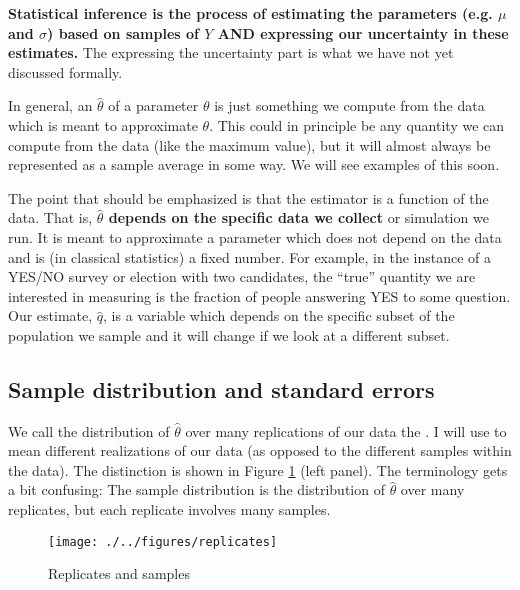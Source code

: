 {\bf Statistical inference is the process of estimating the parameters (e.g. $\mu$ and $\sigma$) based on samples of $Y$ AND expressing our uncertainty in these estimates.} The expressing the uncertainty part is what we have not yet discussed formally. 


In general, an  $\hat{\theta}$  of a parameter $\theta$ is just something we compute from the data which is meant to approximate $\theta$. This could in principle be any quantity we can compute from the data (like the maximum value), but it will almost always be represented as a sample average in some way. We will see examples of this soon. 

The point that should be emphasized is that the estimator is a function of the data. That is, {\bf $\hat{\theta}$ depends on the specific data we collect} or simulation we run. It is meant to approximate a parameter which does not depend on the data and is (in classical statistics) a fixed number. For example,  in the instance of a YES/NO survey or election with two candidates, the ``true'' quantity we are interested in measuring is the fraction of people answering YES to some question. Our estimate, $\hat{q}$, is a variable which depends on the specific subset of the population we sample and it will change if we look at a different subset. 



\subsection{Sample distribution and standard errors}
 We call the distribution of $\hat{\theta}$ over many replications of our data the . I will use  to mean different realizations of our data (as opposed to the different samples within the data). The distinction is shown in Figure \ref{fig:rep_samp} (left panel). The terminology gets a bit confusing: The sample distribution is the distribution of $\hat{\theta}$ over many replicates, but each replicate involves many samples. 

\begin{figure}[h]
\centering
\texttt{[image: ./../figures/replicates]}
\caption{Replicates and samples }\label{fig:rep_samp}
\end{figure}


